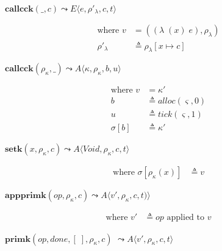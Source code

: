 \documentclass[12pt,draft]{article}
\newcommand{\singlelamsyn}[2]{(\lambda\;(#1)\;#2)}
\begin{document}
\begin{multicols*}{2}
\begin{center}
  $\textbf{callcck}(\_ , c)
  \leadsto E\langle e , \rho'_\lambda , c , t \rangle$
\end{center}
\vspace{-7mm}
\begin{align*}
\text{where } v &= (\singlelamsyn{x}{e} , \rho_{\lambda}) \\
\rho'_{\lambda} &\triangleq \rho_{\lambda}[x \mapsto c]
\end{align*}
\begin{center}
  $\textbf{callcck}(\rho_\kappa , \_)
  \leadsto A\langle \kappa , \rho_\kappa , b  , u \rangle$
\end{center}
\vspace{-7mm}
\begin{align*}
\text{where } v &= \kappa' \\
b &\triangleq alloc(\varsigma, 0) \\
u &\triangleq tick(\varsigma, 1) \\
\sigma[b] &\triangleq \kappa'
\end{align*}
\begin{center}
  $\textbf{setk}(x, \rho_\kappa, c)
  \leadsto A\langle \textit{Void}, \rho_\kappa , c , t \rangle$
\end{center}
\vspace{-7mm}
\begin{align*}
\text{where } \sigma[\rho_{\kappa}(x)] &\triangleq v
\end{align*}
\begin{center}
  $\textbf{appprimk}(op, \rho_\kappa, c)
  \leadsto A\langle v' , \rho_\kappa, c , t) \rangle$
\end{center}
\vspace{-7mm}
\begin{align*}
\text{where } v' &\triangleq op \text{ applied to } v
\end{align*}
\begin{center}
  $\textbf{primk}(op, done, [\;], \rho_\kappa, c)$
  $\leadsto A\langle v' , \rho_\kappa , c , t \rangle$
\end{center}
\vspace{-7mm}
\begin{align*}

\end{align*}
\end{multicols*}
\end{document}
